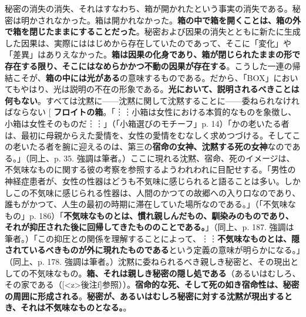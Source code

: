\documentclass[9pt,b5j,twoside,twocolumn]{utarticle}
\makeatletter
\def\yakuchu{%
\@ifnextchar[\@xfootnote %
{\stepcounter{yakuchu}%
\protected@xdef\@thefnmark{\theyakuchu}%
\@footnotemark\@footnotetext}}
\makeatother
\begin{document}
秘密の消失の消失、それはすなわち、箱が開かれたという事実の消失である。秘密は明かされなかった。箱は開かれなかった。\textbf{箱の中で箱を開くことは、箱の外で箱を閉じたままにすることだった}。秘密および因果の消失とともに新たに生成した因果は、実際にははじめから存在していたのであって、そこに「変化」や「差異」はありえなかった。\textbf{箱は因果の化身であり、箱が閉じられたままの形で存在する限り、そこにはなめらかかつ不動の因果が存在する}。こうした一連の帰結こそが、\textbf{箱の中には光がある}の意味するものである。だから、「BOX」においてもやはり、光は説明の不在の形象である。\textbf{光において、説明されるべきことは何もない}。すべては沈黙に------沈黙に関して沈黙することに------委ねられなければならない\yakuchu{\textbf{フロイトの箱}。「︙︙小箱は女性における本質的なものを象徴し、小箱は女性そのものだ︙︙」（「小箱選びのモチーフ」p. 14）「かの老いたる者は、最初に母親からえた愛情を、女性の愛情をむなしく求めつづける。そしてこの老いたる者を腕に迎えるのは、第三の\textbf{宿命の女神、沈黙する死の女神}なのである。」（同上、p. 35. 強調は筆者。）ここに現れる沈黙、宿命、死のイメージは、不気味なものに関する彼の考察を参照するようわれわれに目配せする。「男性の神経症患者が、女性の性器はどうも不気味に感じられると語ることは多い。しかしこの不気味に感じられる性器は、人間のかつての故郷への入り口なのであり、誰もがかつて、人生の最初の時期に滞在していた場所なのである。」（「不気味なもの」p. 186）「\textbf{不気味なものとは、慣れ親しんだもの、馴染みのものであり、それが抑圧された後に回帰してきたもののことである。}」（同上、p. 187. 強調は筆者。）「この抑圧との関係を理解することによって、︙︙\textbf{不気味なものとは、隠されているべきものが外に現れたものである}という定義の意味が明らかになる。」（同上、p. 178. 強調は筆者。）沈黙に委ねられるべき親しき秘密と、その現出としての不気味なもの。\textbf{箱、それは親しき秘密の隠し処である}（あるいはむしろ、その家である（[\pbox<z>{後注}f]参照））。\textbf{宿命的な死、そして死の如き宿命性は、秘密の周囲に形成される}。\textbf{秘密が、あるいはむしろ秘密に対する沈黙が現出するとき、それは不気味なものとなる。}}。
\end{document}
